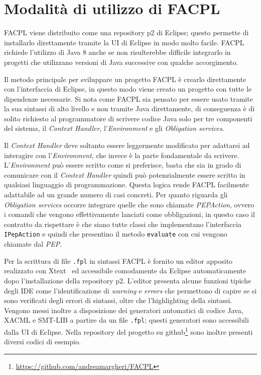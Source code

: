 \section{Modalità di utilizzo di FACPL}
\label{sec:modalitaFACPL}
FACPL viene distribuito come una repository p2 di Eclipse; questo permette di installarlo direttamente tramite la UI di Eclipse in modo molto facile. FACPL richiede l'utilizzo di Java 8 anche se non risulterebbe difficile integrarlo in progetti che utilizzano versioni di Java successive con qualche accorgimento.\par
Il metodo principale per sviluppare un progetto FACPL è crearlo direttamente con l'interfaccia di Eclipse, in questo modo viene creato un progetto con tutte le dipendenze necessarie. Si nota come FACPL sia pensato per essere usato tramite la sua sintassi di alto livello e non tramite Java direttamente, di conseguenza è di solito richiesto al programmatore di scrivere codice Java solo per tre componenti del sistema, il \emph{Context Handler}, l'\emph{Environment} e gli \emph{Obligation services}.\par
Il \emph{Context Handler} deve soltanto essere leggermente modificato per adattarsi ad interagire con l'\emph{Environment}, che invece è la parte fondamentale da scrivere. L'\emph{Environment} può essere scritto come si preferisce, basta che sia in grado di comunicare con il \emph{Context Handler} quindi può potenzialmente essere scritto in qualsiasi linguaggio di programmazione. Questa logica rende FACPL facilmente adattabile ad un grande numero di casi concreti. Per quanto riguarda gli \emph{Obligation services} occorre integrare quelle che sono chiamate \emph{PEPAction}, ovvero i comandi che vengono effettivamente lanciati come obbligazioni, in questo caso il contratto da rispettare è che siano tutte classi che implementano l'interfaccia \texttt{IPepAction} e quindi che presentino il metodo \texttt{evaluate} con cui vengono chiamate dal \emph{PEP}.\par
Per la scrittura di file \texttt{.fpl} in sintassi FACPL è fornito un editor apposito realizzato con Xtext~\cite{eclipseXtext} ed accessibile comodamente da Eclipse automaticamente dopo l'installazione della repository p2. L'editor presenta alcune funzioni tipiche degli IDE come l'identificazione di \emph{warning} e \emph{errors} che permettono di capire se si sono verificati degli errori di sintassi, oltre che l'highlighting della sintassi. Vengono messi inoltre a disposizione dei generatori automatici di codice Java, XACML e SMT-LIB a partire da un file \texttt{.fpl}; questi generatori sono accessibili dalla UI di Eclipse. Nella repository del progetto su github\footnote{\url{https://github.com/andreamargheri/FACPL}} sono inoltre presenti diversi codici di esempio.\par


